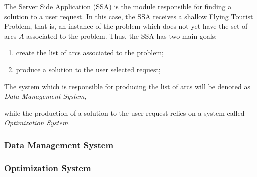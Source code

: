 

The Server Side Application (SSA) is the module responsible for finding a solution 
to a user request. In this case, the SSA receives a shallow Flying Tourist Problem,
that is, an instance of the problem which does not yet have the set of arcs $A$ associated to the problem.
Thus, the SSA has two main goals:

\begin{enumerate}
  \item create the list of arcs associated to the problem;
  \item produce a solution to the user selected request;
\end{enumerate}

The system which is responsible for producing the list of arcs will be denoted as \textit{Data Management System},

while the production of a solution to the user request relies on a system called \textit{Optimization System}.




\subsubsection{Data Management System}
\label{sec:dms_design}


\subsubsection{Optimization System}
\label{sec:optimization_design}



